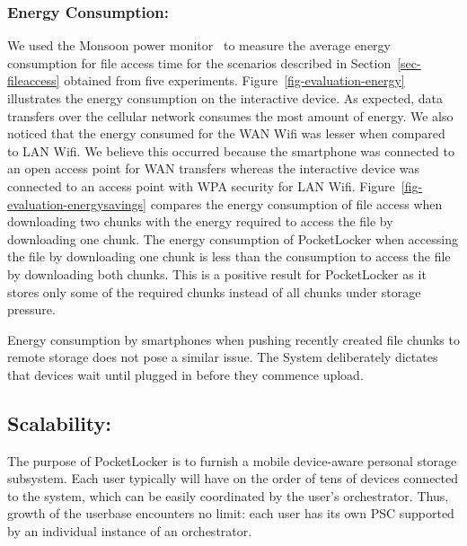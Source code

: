 \subsubsection{Energy Consumption:\space}We used the Monsoon power
monitor~\cite{monsoon} to measure the average energy consumption for file access time
for the scenarios described in Section~\ref{sec-fileaccess} obtained from five experiments.
Figure~\ref{fig-evaluation-energy} illustrates the energy consumption on the
interactive device. As expected, data transfers over the cellular network
consumes the most amount of energy. We also noticed that the energy consumed
for the WAN Wifi was lesser when compared to LAN Wifi. We believe this
occurred because the smartphone was connected to an open access point for WAN
transfers whereas the interactive device was connected to an access point
with WPA security for LAN Wifi. Figure~\ref{fig-evaluation-energysavings}
compares the energy consumption of file access when downloading two chunks
with the energy required to access the file by downloading one chunk. The
energy consumption of PocketLocker when accessing the file by downloading one
chunk is less than the consumption to access the file by downloading both
chunks. This is a positive result for PocketLocker as it stores only some of
the required chunks instead of all chunks under storage pressure.

Energy consumption by smartphones when pushing recently created file chunks to
remote storage does not pose a similar issue.  The System deliberately dictates
that devices wait until plugged in before they commence upload.

\subsection{Scalability:\space} The purpose of PocketLocker is to furnish a
mobile device-aware personal storage subsystem. Each user typically will have
on the order of tens of devices connected to the system, which can be easily
coordinated by the user's orchestrator. Thus, growth of the userbase encounters
no limit: each user has its own PSC supported by an individual instance of an
orchestrator.


